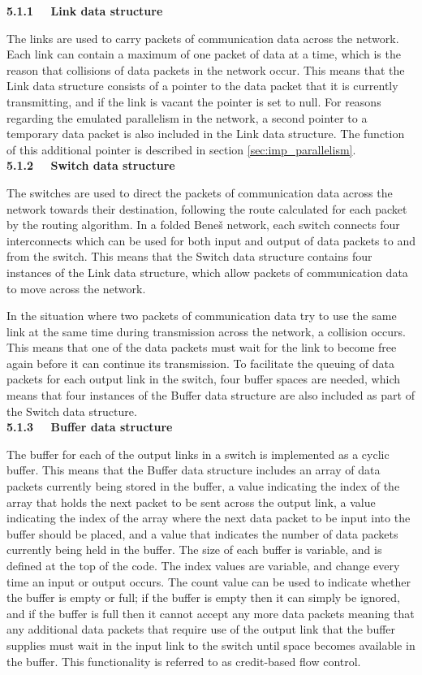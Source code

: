 \documentclass[a4paper, 12pt]{article}
\begin{document}
\noindent\textbf{5.1.1 \ \ Link data structure}

\noindent The links are used to carry packets of communication data across the network. Each link can contain a maximum of one packet of data at a time, which is the reason that collisions of data packets in the network occur. This means that the Link data structure consists of a pointer to the data packet that it is currently transmitting, and if the link is vacant the pointer is set to null. For reasons regarding the emulated parallelism in the network, a second pointer to a temporary data packet is also included in the Link data structure. The function of this additional pointer is described in section \ref{sec:imp_parallelism}.\\

\noindent\textbf{5.1.2 \ \ Switch data structure}

\noindent The switches are used to direct the packets of communication data across the network towards their destination, following the route calculated for each packet by the routing algorithm. In a folded Bene\v{s} network, each switch connects four interconnects which can be used for both input and output of data packets to and from the switch. This means that the Switch data structure contains four instances of the Link data structure, which allow packets of communication data to move across the network. 

In the situation where two packets of communication data try to use the same link at the same time during transmission across the network, a collision occurs. This means that one of the data packets must wait for the link to become free again before it can continue its transmission. To facilitate the queuing of data packets for each output link in the switch, four buffer spaces are needed, which means that four instances of the Buffer data structure are also included as part of the Switch data structure.\\

\noindent\textbf{5.1.3 \ \ Buffer data structure}

\noindent The buffer for each of the output links in a switch is implemented as a cyclic buffer. This means that the Buffer data structure includes an array of data packets currently being stored in the buffer, a value indicating the index of the array that holds the next packet to be sent across the output link, a value indicating the index of the array where the next data packet to be input into the buffer should be placed, and a value that indicates the number of data packets currently being held in the buffer. The size of each buffer is variable, and is defined at the top of the code. The index values are variable, and change every time an input or output occurs. The count value can be used to indicate whether the buffer is empty or full; if the buffer is empty then it can simply be ignored, and if the buffer is full then it cannot accept any more data packets meaning that any additional data packets that require use of the output link that the buffer supplies must wait in the input link to the switch until space becomes available in the buffer. This functionality is referred to as credit-based flow control.\\
\end{document}

